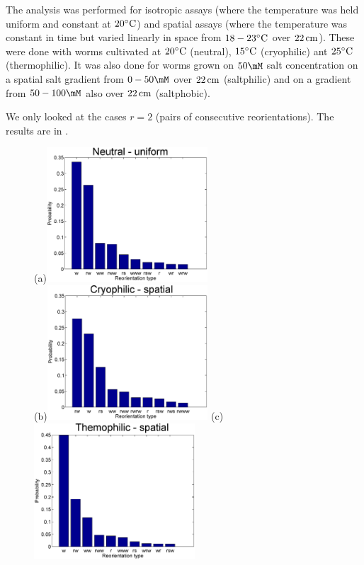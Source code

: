 \documentclass[12pt]{article}
\begin{document}
The analysis was performed for isotropic assays (where the temperature was held uniform and constant at $20^\circ\mathrm{C}$) and spatial assays (where the temperature was constant in time but varied linearly in space from $18-23^\circ\mathrm{C}$ over $22\,\mathrm{cm}$). These were done with worms cultivated at $20^\circ\mathrm{C}$ (neutral), $15^\circ\mathrm{C}$ (cryophilic) ant $25^\circ\mathrm{C}$ (thermophilic). It was also done for worms grown on $50\mM$ salt concentration on a spatial salt gradient from $0-50\mM$ over $22\,\mathrm{cm}$ (saltphilic) and on a gradient from $50-100\mM$ also over $22\,\mathrm{cm}$ (saltphobic).

We only looked at the cases $r=2$ (pairs of consecutive reorientations). The results are in .


\begin{figure}
  \begin{center}
    (a)\includegraphics[width=6cm]{ReoTypeProb-neutraliso.eps}\\[1cm]
    (b)\includegraphics[width=6cm]{ReoTypeProb-cryospat.eps}
    (c)\includegraphics[width=6cm]{ReoTypeProb-thermospat.eps}\\[1cm]

\end{center}
\end{figure}
\end{document}
